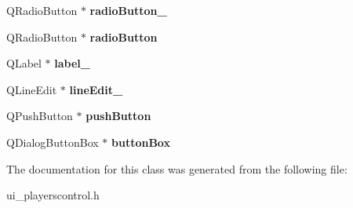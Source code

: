 \begin{DoxyCompactItemize}
\item 
\hypertarget{classUi__PlayersControl_a108770d25374326cb8f0b4187e24fb3b}{Q\-Radio\-Button $\ast$ {\bfseries radio\-Button\-\_}}\label{classUi__PlayersControl_a108770d25374326cb8f0b4187e24fb3b}

\item 
\hypertarget{classUi__PlayersControl_ae08f650de3ada3aee4574c26b1e7ee38}{Q\-Radio\-Button $\ast$ {\bfseries radio\-Button}}\label{classUi__PlayersControl_ae08f650de3ada3aee4574c26b1e7ee38}

\item 
\hypertarget{classUi__PlayersControl_a55796711c4a4ffa8b15b16d8edda9bd4}{Q\-Label $\ast$ {\bfseries label\-\_}}\label{classUi__PlayersControl_a55796711c4a4ffa8b15b16d8edda9bd4}

\item 
\hypertarget{classUi__PlayersControl_a5dde1725760ebd0941f5f0699e1daf36}{Q\-Line\-Edit $\ast$ {\bfseries line\-Edit\-\_}}\label{classUi__PlayersControl_a5dde1725760ebd0941f5f0699e1daf36}

\item 
\hypertarget{classUi__PlayersControl_a36d1723722eae8f4cad725dd409ece22}{Q\-Push\-Button $\ast$ {\bfseries push\-Button}}\label{classUi__PlayersControl_a36d1723722eae8f4cad725dd409ece22}

\item 
\hypertarget{classUi__PlayersControl_a643c6d4bed8306b915c7248a885eb04f}{Q\-Dialog\-Button\-Box $\ast$ {\bfseries button\-Box}}\label{classUi__PlayersControl_a643c6d4bed8306b915c7248a885eb04f}

\end{DoxyCompactItemize}


The documentation for this class was generated from the following file\-:\begin{DoxyCompactItemize}
\item 
ui\-\_\-playerscontrol.\-h\end{DoxyCompactItemize}
